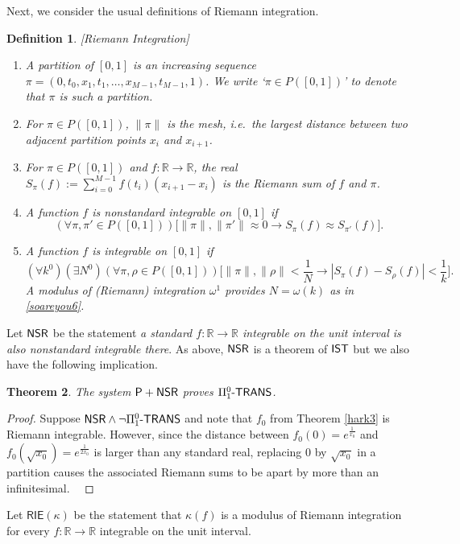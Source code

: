 \documentclass[reqno]{amsart}
\newtheorem{thm}{Theorem}
\newtheorem{defi}[thm]{Definition}
\newcommand\be{\begin{equation}}
\newcommand\ee{\end{equation}}
\def\bdefi{\begin{defi}\rm}
\def\edefi{\end{defi}}
\def\P{\textup{\textsf{P}}}
\def\R{{\mathbb  R}}
\def\R{{\mathbb{R}}}
\def\di{\rightarrow}
\def\paai{\Pi_{1}^{0}\textup{-\textsf{TRANS}}}
\def\IST{\textup{\textsf{IST}}}
\def\NSR{\textup{\textsf{NSR}}}
\def\HAC{\textup{\textsf{HAC}}}
\def\INT{\textup{\textsf{int}}}
\numberwithin{equation}{section}
\numberwithin{thm}{section}
\begin{document}
%
Next, we consider the usual definitions of Riemann integration.  
\bdefi[Riemann Integration]\label{kunko}~
\begin{enumerate}
\item A \emph{partition} of $[0,1]$ is an increasing sequence $\pi=(0, t_{0}, x_{1},t_{1},  \dots,x_{M-1}, t_{M-1}, 1)$.  We write `$\pi \in P([0,1]) $' to denote that $\pi$ is such a partition.
\item For $\pi\in P([0,1])$, $\|\pi\|$ is the \emph{mesh}, i.e.\ the largest distance between two adjacent partition points $x_{i}$ and $x_{i+1}$. 
\item For $\pi\in P([0,1])$ and $f:\R\di \R$, the real $S_{\pi}(f):=\sum_{i=0}^{M-1}f(t_{i}) (x_{i+1}-x_{i}) $ is the \emph{Riemann sum} of $f$ and $\pi$.  
\item A function $f$ is \emph{nonstandard integrable} on $[0,1]$ if
\be\label{soareyou5}
(\forall \pi, \pi' \in P([0,1]))\big[\|\pi\|,\| \pi'\|\approx 0  \di S_{\pi}(f)\approx S_{\pi'}(f)  \big].
\ee
\item A function $f$ is \emph{integrable} on $[0,1]$ if
\be\label{soareyou6}\textstyle
(\forall k^{0})(\exists N^{0})(\forall \pi, \rho \in P([0,1]))\big[\|\pi\|,\| \rho\|<\frac{1}{N}  \di |S_{\pi}(f)- S_{\rho}(f)|<\frac{1}{k}  \big].
\ee
A modulus of (Riemann) integration $\omega^{1}$ provides $N=\omega(k)$ as in \eqref{soareyou6}.  
\end{enumerate}
\edefi
Let $\NSR$ be the statement \emph{a standard $f:\R\di \R$ integrable on the unit interval is also \emph{nonstandard integrable} there}.  %
As above, $\NSR$ is a theorem of $\IST$ but we also have the following implication.  
\begin{thm}\label{hark38} 
The system $\P+\NSR$ proves $\paai$.  
\end{thm}
\begin{proof}
Suppose $\NSR\wedge \neg \paai$ and note that $f_{0}$ from Theorem \ref{hark3} is Riemann integrable.  However, since the distance between $f_{0}(0)=e^{\frac{1}{x_{0}}}$ and $f_{0}(\sqrt{x_{0}})=e^{\frac{1}{2x_{0}}}$ is larger than any standard real, replacing $0$ by $\sqrt{x_{0}}$ in a partition causes the associated Riemann sums to be 
apart by more than an infinitesimal. \
\end{proof}
Let $\textsf{RIE}(\kappa)$ be the statement that $\kappa(f)$ is a modulus of Riemann integration for every $f:\R\di \R$ integrable on the unit interval.  
\end{document}
